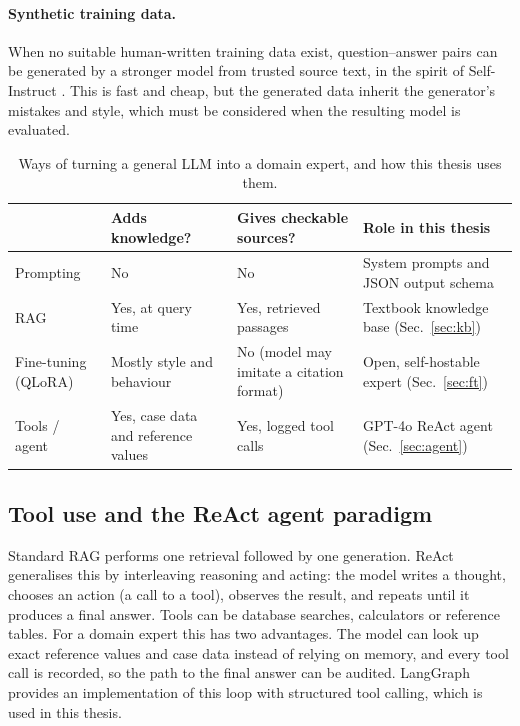 \paragraph{Synthetic training data.} When no suitable human-written training data exist, question--answer pairs can be generated by a stronger model from trusted source text, in the spirit of Self-Instruct \cite{wang2023selfinstruct}. This is fast and cheap, but the generated data inherit the generator's mistakes and style, which must be considered when the resulting model is evaluated.

\begin{table}[H]
\centering
\caption{Ways of turning a general LLM into a domain expert, and how this thesis uses them.}
\label{tab:approaches}
\small
\begin{tabularx}{\textwidth}{l X X X}
\toprule
 & \textbf{Adds knowledge?} & \textbf{Gives checkable sources?} & \textbf{Role in this thesis} \\
\midrule
Prompting & No & No & System prompts and JSON output schema \\
RAG & Yes, at query time & Yes, retrieved passages & Textbook knowledge base (Sec.~\ref{sec:kb}) \\
Fine-tuning (QLoRA) & Mostly style and behaviour & No (model may imitate a citation format) & Open, self-hostable expert (Sec.~\ref{sec:ft}) \\
Tools / agent & Yes, case data and reference values & Yes, logged tool calls & GPT-4o ReAct agent (Sec.~\ref{sec:agent}) \\
\bottomrule
\end{tabularx}
\end{table}

\subsection{Tool use and the ReAct agent paradigm}

Standard RAG performs one retrieval followed by one generation. ReAct \cite{yao2023react} generalises this by interleaving reasoning and acting: the model writes a thought, chooses an action (a call to a tool), observes the result, and repeats until it produces a final answer. Tools can be database searches, calculators or reference tables. For a domain expert this has two advantages. The model can look up exact reference values and case data instead of relying on memory, and every tool call is recorded, so the path to the final answer can be audited. LangGraph \cite{langgraph} provides an implementation of this loop with structured tool calling, which is used in this thesis.

